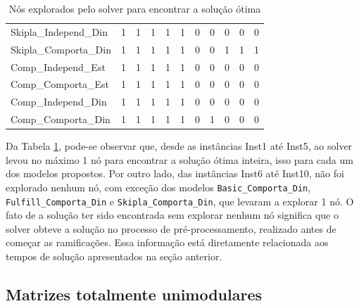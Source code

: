 \begin{table}[H]
\begin{tabular}{@{}lcccccccccc@{}}
		Skipla\_Independ\_Din  & 1              & 1              & 1              & 1              & 1              & 0              & 0              & 0              & 0              & 0               \\
		Skipla\_Comporta\_Din  & 1              & 1              & 1              & 1              & 1              & 0              & 0              & 1              & 1              & 1               \\ \hline
		Comp\_Independ\_Est    & 1              & 1              & 1              & 1              & 1              & 0              & 0              & 0              & 0              & 0               \\
		Comp\_Comporta\_Est    & 1              & 1              & 1              & 1              & 1              & 0              & 0              & 0              & 0              & 0               \\
		Comp\_Independ\_Din    & 1              & 1              & 1              & 1              & 1              & 0              & 0              & 0              & 0              & 0               \\
		Comp\_Comporta\_Din    & 1              & 1              & 1              & 1              & 1              & 0              & 1              & 0              & 0              & 0               \\
		\bottomrule
	\end{tabular}
	\caption{Nós explorados pelo solver para encontrar a solução ótima}
	\label{tab:nodos_explorados}
\end{table}

Da Tabela \ref{tab:nodos_explorados}, pode-se observar que, desde as instâncias Inst1 até Inst5, ao solver levou no máximo 1 nó para encontrar a solução ótima inteira, isso para cada um dos modelos propostos. Por outro lado, das instâncias Inst6 até Inst10, não foi explorado nenhum nó, com exceção dos modelos \texttt{Basic\_Comporta\_Din}, \texttt{Fulfill\_Comporta\_Din} e \texttt{Skipla\_Comporta\_Din}, que levaram a explorar 1 nó. O fato de a solução ter sido encontrada sem explorar nenhum nó significa que o solver obteve a solução no processo de pré-processamento, realizado antes de começar as ramificações. Essa informação está diretamente relacionada aos tempos de solução apresentados na seção anterior.



\subsection{Matrizes totalmente unimodulares} \label{sec: unimodularidade}

